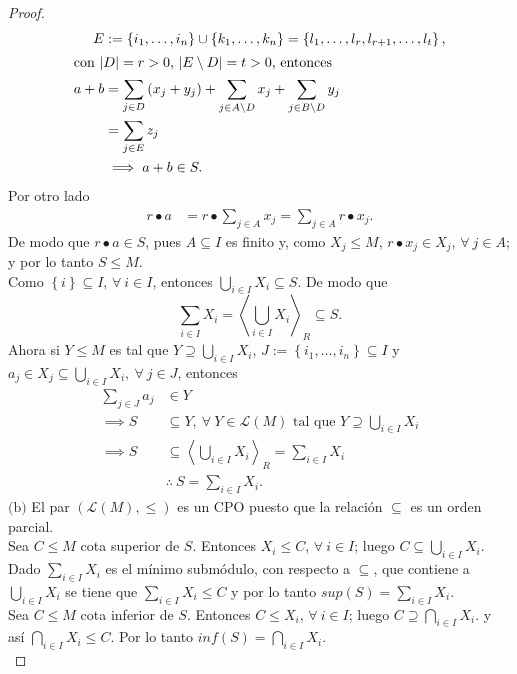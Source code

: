 \documentclass{article}
\newcommand{\crdnlty}[1]{
	\left|#1\right|
}
\newcommand{\lrprth}[1]{
	\left(#1\right)
}
\newcommand{\lrbrack}[1]{
	\left\{#1\right\}
}
\newcommand{\gengroup}[1]{
	\left< #1\right>
}
\newcommand{\genlin}[1]{
	\mathscr{L}\lrprth{#1}
}
\theoremstyle{definition}
\theoremstyle{plain}
\theoremstyle{plain}
\theoremstyle{definition}
\theoremstyle{definition}
\theoremstyle{definition}
\theoremstyle{definition}
\theoremstyle{definition}
\theoremstyle{definition}
\begin{document}
\begin{enumerate}[label=\textbf{Ej \arabic*.}]
\begin{proof}
\begin{align*}
		E&:=\lrbrack{i_1,\dotsc,i_n}\cup
		\lrbrack{k_1,\dotsc,k_n}=\lrbrack{l_1,\dotsc,l_{r},l_{r+1},\dotsc,l_{t}},\\
		\intertext{con $\crdnlty{D}=r>0$, $\crdnlty{E\setminus D}=t>0$, entonces}
		a+b&=\sum_{j\in D}\lrprth{x_j+y_j}+\sum_{j\in A\setminus D}x_j+\sum_{j\in B\setminus D}y_j \\
		&=\sum_{j\in E}z_j\\
		&\implies a+b\in S.
	\end{align*}
	Por otro lado
	\begin{align*}
		r\bullet a&=r\bullet\sum_{j\in A}x_j=\sum_{j\in A}r\bullet x_j.
	\end{align*}
	De modo que $r\bullet a\in S$, pues $A\subseteq I$ es finito y, como $X_j\leq M$, $r\bullet x_j\in X_j$, $\forall\ j\in A$; y por lo tanto $S\leq M$. \\
	Como $\lrbrack{i}\subseteq I$, $\forall\ i\in I$, entonces
	$\bigcup_{i\in I}X_i\subseteq S$. De modo que
	\begin{equation*}
		\sum_{i\in I}X_i=\gengroup{\bigcup_{i\in I}X_i}_R\subseteq S.
	\end{equation*}
	Ahora si $Y\leq M$ es tal que $Y\supseteq \bigcup_{i\in I}X_i$, $J:=\lrbrack{i_1,\dotsc,i_n}\subseteq I$ y $a_j\in X_j\subseteq\bigcup_{i\in I}X_i,\ \forall\ j\in J$, entonces
	\begin{align*}
		\sum_{j\in J}a_j&\in Y\\
		\implies S&\subseteq Y,\ \forall\ Y\in\genlin{M}\text{ tal que } Y\supseteq \bigcup_{i\in I}X_i\\
		\implies S&\subseteq \gengroup{\bigcup_{i\in I}X_i}_R=\sum_{i\in I}X_i\\
		&\therefore\ S=\sum_{i\in I}X_i.
	\end{align*}
	$\boxed{\text{(b)}}$ El par $(\genlin{M},\leq)$ es un CPO puesto que la relación $\subseteq$ es un orden parcial.\\
	Sea $C\leq M$ cota superior de $S$. Entonces $X_i\leq C$, $\forall\ i\in I$; luego $C\subseteq \bigcup_{i\in I}X_i$. Dado $\sum_{i\in I}X_i$ es el mínimo submódulo, con respecto a $\subseteq$, que contiene a $\bigcup_{i\in I}X_i$ se tiene que $\sum_{i\in I}X_i\leq C$ y por lo tanto $sup\lrprth{S}=\sum_{i\in I}X_i$.\\
	Sea $C\leq M$ cota inferior de $S$. Entonces $C\leq X_i$, $\forall\ i\in I$; luego $C\supseteq \bigcap_{i\in I}X_i$. y así $\bigcap_{i\in I}X_i\leq C$. Por lo tanto $inf\lrprth{S}=\bigcap_{i\in I}X_i$.\\
	\begin{equation*}

\end{equation*}
\end{proof}
\end{enumerate}
\end{document}
